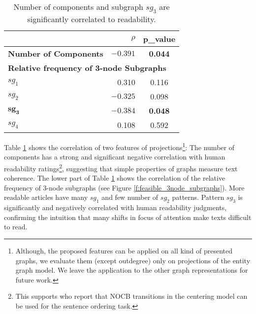 \begin{table}[!h]
\centering
\begin{small}
\begin{tabular}{lrc}
\hline
   & $\rho$ & p\_value\\\hline
\textbf{Number of Components}   &       $\mathbf{-0.391}$       &       \textbf{0.044}  \\\hline

\multicolumn{3}{l}{\textbf{Relative frequency of 3-node Subgraphs}} \\
 $sg_1$ &  0.310 & 0.116\\
 $sg_2$ & $-0.325$ & 0.098\\
$\mathbf{sg_3}$ & $\mathbf{-0.384}$ & \textbf{0.048}\\
 $sg_4$ &  0.108 & 0.592\\\hline
\end{tabular}
\end{small}
\caption{Number of components and subgraph $sg_3$ are significantly correlated to readability.}
  \label{t:comp_3node_pearson}
\end{table}

Table \ref{t:comp_3node_pearson} shows the correlation of two features of projections\footnote{Although, the proposed features can be applied on all kind of presented graphs, we evaluate them (except outdegree) only on projections of the entity graph model. 
We leave the application to the other graph representations for future work.}:
The number of components has a strong and significant negative correlation with human readability ratings\footnote{This supports
   who report that NOCB transitions in the centering model can be used for the sentence ordering task.},
suggesting that simple properties of graphs measure text
coherence. 
The lower part of Table \ref{t:comp_3node_pearson} shows the correlation of the relative frequency of 3-node subgraphs (see Figure \ref{f:feasible_3node_subgraphs}).  
More readable articles have many $sg_1$ and few number of $sg_2$ patterns. 
Pattern $sg_3$ is significantly and negatively correlated with human readability judgments, confirming the intuition that many shifts in focus
of attention make texts difficult to read. 



